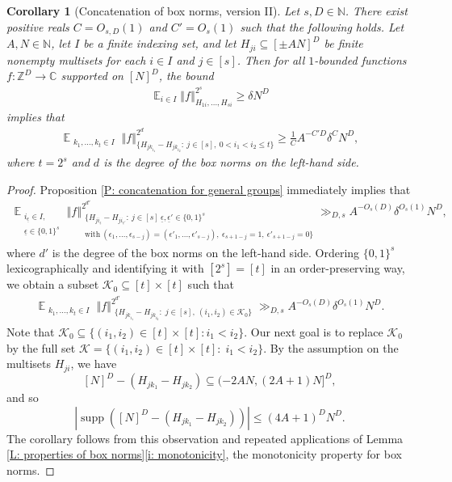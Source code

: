 \documentclass[11pt]{amsart}
\newtheorem{corollary}[lemma]{Corollary}
\theoremstyle{definition}
\DeclareMathOperator*{\E}{\mathbb{E}}
\newcommand{\C}{{\mathbb C}}
\newcommand{\N}{{\mathbb N}}
\newcommand{\Z}{{\mathbb Z}}
\newcommand{\CK}{{\mathcal K}}
\newcommand{\ueps}{{\underline{\epsilon}}}
\DeclareMathOperator{\supp}{supp}
\newcommand{\norm}[1]{\left\Vert #1\right\Vert}
\newcommand{\abs}[1]{\mathopen{}\left| #1\mathclose{}\right|}
\begin{document}
\begin{corollary}[Concatenation of box norms, version II]\label{C: concatenation for general groups III}
Let $s,D \in \mathbb{N}$.  There exist positive reals $C=O_{s,D}(1)$ and $C'=O_{s}(1)$ such that the following holds.
    Let $A,N\in\N$, let $I$ be a finite indexing set, and let $H_{ji}\subseteq [\pm AN]^D$ be finite nonempty multisets for each $i\in I$ and $j\in[s]$. Then for all $1$-bounded functions $f:\Z^D\to\C$ supported on $[N]^D$, the bound
    \begin{align*}
        \E_{i\in I}\norm{f}_{H_{1i}, \ldots, H_{si}}^{2^{s}}\geq \delta N^D
    \end{align*}
    implies that
    \begin{align}\label{E: concatenation simplified}
        \E_{\substack{k_1, \ldots, k_{t}\in I}}\norm{f}_{\{H_{j k_{i_1}}-H_{j k_{i_2}}:\ j\in[s],\ 0<i_1<i_2\leq t\}}^{2^d}\geq \frac{1}{C} A^{-C'D} \delta^{C} N^D,
    \end{align}
    where $t=2^s$ and $d$ is the degree of the box norms on the left-hand side. 
\end{corollary}
\begin{proof}
    Proposition \ref{P: concatenation for general groups} immediately implies that
    \begin{align*}
        \E_{\substack{i_\ueps\in I,\\ \ueps\in\{0,1\}^s}}\norm{f}_{\substack{\{H_{j i_\ueps}-H_{j i_{\ueps'}}:\ j\in[s]\ \ueps,\ueps'\in\{0,1\}^s\\ \mathrm{with}\ (\epsilon_1, \ldots,  \epsilon_{s-j}) = (\epsilon'_1, \ldots,  \epsilon'_{s-j}),\ \epsilon_{s+1-j}=1,\ \epsilon'_{s+1-j} = 0\}}}^{2^{d'}} \gg_{D, s} A^{-O_s(D)}\delta^{O_s(1)}N^D,
    \end{align*}
    where $d'$ is the degree of the box norms on the left-hand side. Ordering $\{0,1\}^s$ lexicographically and identifying it with $[2^s]=[t]$ in an order-preserving way, we obtain a subset $\CK_0\subseteq[t]\times[t]$ such that
    \begin{align*}
        \E_{\substack{k_1, \ldots, k_t\in I}}\norm{f}_{\substack{\{H_{j k_{i_1}}-H_{j k_{i_2}}:\; j\in[s],\ ({i_1}, {i_2})\in\CK_0\}}}^{2^{d'}} \gg_{D, s} A^{-O_s(D)}\delta^{O_s(1)}N^D.
    \end{align*}    
    Note that $\CK_0 \subseteq \{(i_1,i_2) \in [t]\times [t]: i_1<i_2\}$.  Our next goal is to replace $\CK_0$ by the full set $\CK = \{(i_1, i_2)\in[t]\times[t]:\; i_1<i_2\}$.
    By the assumption on the multisets $H_{ji}$, we have
    $$[N]^D - (H_{j k_1}-H_{j k_2})\subseteq (-2A N, (2A+1)N]^D,$$ and so $$\abs{\supp([N]^D - (H_{j k_1}-H_{j k_2}))}\leq (4A+1)^D N^D.$$  The corollary follows from this observation and repeated applications of Lemma \ref{L: properties of box norms}\eqref{i: monotonicity}, the monotonicity property for box norms.
\end{proof}
\end{document}
